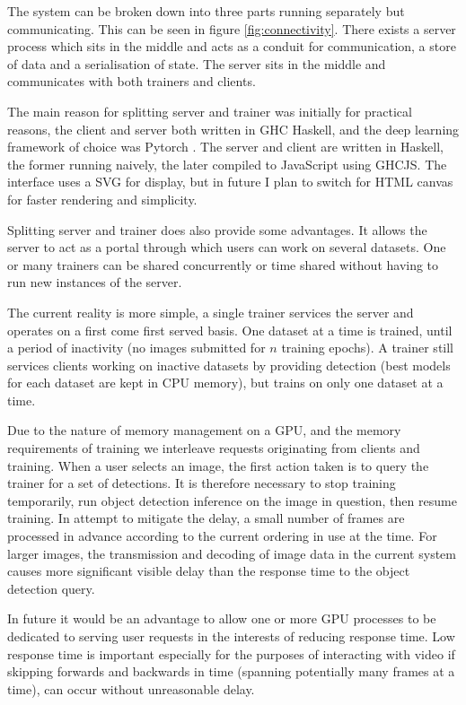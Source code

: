 The system can be broken down into three parts running separately but communicating. This can be seen in figure \ref{fig:connectivity}. There exists a server process which sits in the middle and acts as a conduit for communication, a store of data and a serialisation of state. The server sits in the middle and communicates with both trainers and clients.

The main reason for splitting server and trainer was initially for practical reasons, the client and server both written in \gls{GHC} Haskell, and the deep learning framework of choice was Pytorch \cite{Paszke2017}. The server and client are written in Haskell, the former running naively, the later compiled to JavaScript using \gls{GHCJS}. The interface uses a \gls{SVG} for display, but in future I plan to switch for \gls{HTML} canvas for faster rendering and simplicity.

Splitting server and trainer does also provide some advantages. It allows the server to act as a portal through which users can work on several datasets. One or many trainers can be shared concurrently or time shared without having to run new instances of the server. 

The current reality is more simple, a single trainer services the server and operates on a first come first served basis. One dataset at a time is trained, until a period of inactivity (no images submitted for $ n $ training epochs). A trainer still services clients working on inactive datasets by providing detection (best models for each dataset are kept in \gls{CPU} memory), but trains on only one dataset at a time. 

Due to the nature of memory management on a \gls{GPU}, and the memory requirements of training we interleave requests originating from clients and training. When a user selects an image, the first action taken is to query the trainer for a set of detections. It is therefore necessary to stop training temporarily, run object detection inference on the image in question, then resume training. In attempt to mitigate the delay, a small number of frames are processed in advance according to the current ordering in use at the time. For larger images, the transmission and decoding of image data in the current system causes more significant visible delay than the response time to the object detection query.

In future it would be an advantage to allow one or more \gls{GPU} processes to be dedicated to serving user requests in the interests of reducing response time. Low response time is important especially for the purposes of interacting with video if skipping forwards and backwards in time (spanning potentially many frames at a time), can occur without unreasonable delay.

